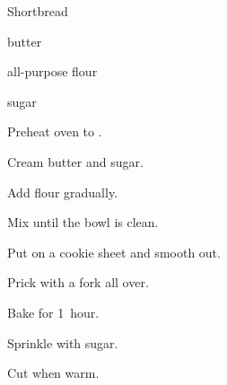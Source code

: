 \begin{recipe}{Shortbread}{}{}

\begin{ingredients}
\item {} butter
\item {} all-purpose flour
\item {} sugar
\end{ingredients}

\begin{directions}
\item Preheat oven to .
\item Cream butter and sugar.
\item Add flour gradually.
\item Mix until the bowl is clean.
\item Put on a cookie sheet and smooth out.
\item Prick with a fork all over.
\item Bake for 1~hour.
\item Sprinkle with sugar.
\item Cut when warm.
\end{directions}

\end{recipe}
